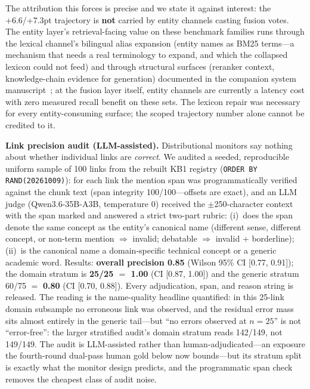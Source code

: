 \documentclass[preprint,12pt]{elsarticle}
\begin{document}
The attribution this forces is precise and we state it against interest:
the +6.6/+7.3pt trajectory is \textbf{not} carried by entity channels
casting fusion votes. The entity layer's retrieval-facing value on these
benchmark families runs through the lexical channel's bilingual alias
expansion (entity names as BM25 terms---a mechanism that needs a real
terminology to expand, and which the collapsed lexicon could not feed) and
through structural surfaces (reranker context, knowledge-chain evidence
for generation) documented in the companion system
manuscript~\cite{companion}; at the fusion
layer itself, entity channels are currently a latency cost with zero
measured recall benefit on these sets. The lexicon repair was necessary
for every entity-consuming surface; the scoped trajectory number alone
cannot be credited to it.

\textbf{Link precision audit (LLM-assisted).} Distributional monitors say
nothing about whether individual links are \emph{correct}. We audited a
seeded, reproducible uniform sample of 100 links from the rebuilt KB1
registry (\texttt{ORDER BY RAND(20261009)}): for each link the mention
span was programmatically verified against the chunk text (span integrity
100/100---offsets are exact), and an LLM judge (Qwen3.6-35B-A3B,
temperature 0) received the $\pm$250-character context with the span
marked and answered a strict two-part rubric: (i)~does the span denote the
same concept as the entity's canonical name (different sense, different
concept, or non-term mention $\Rightarrow$ invalid; debatable $\Rightarrow$
invalid + borderline); (ii)~is the canonical name a domain-specific
technical concept or a generic academic word. Results: \textbf{overall
precision 0.85} (Wilson 95\% CI [0.77, 0.91]); the domain stratum is
\textbf{25/25 $=$ 1.00} (CI [0.87, 1.00]) and the generic stratum
60/75 $=$ \textbf{0.80} (CI [0.70, 0.88]). Every adjudication, span, and
reason string is released. The reading is the name-quality headline
quantified: in this 25-link domain subsample no erroneous link was
observed, and the residual error mass sits almost entirely in the generic
tail---but ``no errors observed at $n{=}25$'' is not ``error-free'': the
larger stratified audit's domain stratum reads 142/149, not 149/149. The audit is LLM-assisted rather than
human-adjudicated---an exposure the fourth-round dual-pass human gold
below now bounds---but its stratum split is exactly what
the monitor design predicts, and the programmatic span check removes the
cheapest class of audit noise.
\end{document}
